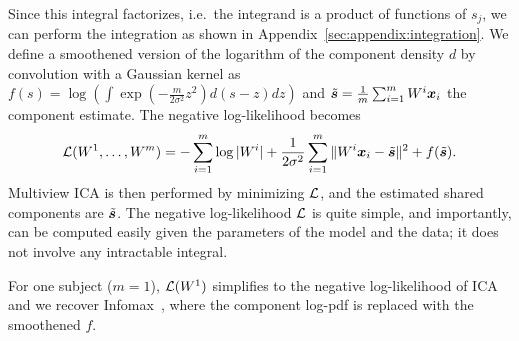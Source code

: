%
Since this integral factorizes, i.e.\ the integrand is a product of functions of $s_j$, we can perform the integration as shown in Appendix~\ref{sec:appendix:integration}. We define a smoothened version of the logarithm of the component density $d$ by convolution with a Gaussian kernel as
$
    f(s)= \log \left(\int \exp(-\frac{m}{2\sigma^2} z^2) d(s-z) dz\right)
$
and $\tilde{\boldsymbol{s}} = \frac1m\sum_{i=1}^m W^i\boldsymbol{x}_i$ the component estimate.
The negative log-likelihood becomes
\begin{equation}
    \label{eq:cost_function}
    \mathcal{L}(W^1, \dots, W^m) = -\sum_{i=1}^m \log|W^i| + \frac1{2\sigma^2}\sum_{i=1}^m\|W^i\boldsymbol{x}_i - \tilde{\boldsymbol{s}}\|^2 + f(\tilde{\boldsymbol{s}}).
\end{equation}
Multiview ICA is then performed by minimizing $\mathcal{L}$, and the estimated shared components are $\tilde{\boldsymbol{s}}$.
The negative log-likelihood $\mathcal{L}$ is quite simple, and importantly, can be computed easily given the parameters of the model and the data; it does not involve any intractable integral.
%

For one subject ($m=1$), $\mathcal{L}(W^1)$ simplifies to the negative log-likelihood of ICA and we recover Infomax~\cite{bell1995information,cardoso1997infomax}, where the component log-pdf is replaced with the smoothened $f$.
%
